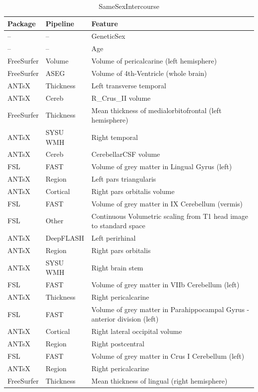 \documentclass[
  10pt,
]{article}
\begin{document}
\begin{table}

\caption{\label{tab:compare-predictions}SameSexIntercourse}
\centering
\begin{tabular}[t]{lll}
\toprule
Package & Pipeline & Feature\\
\midrule
-- & -- & GeneticSex\\
-- & -- & Age\\
FreeSurfer & Volume & Volume of pericalcarine (left hemisphere)\\
FreeSurfer & ASEG & Volume of 4th-Ventricle (whole brain)\\
ANTsX & Thickness & Left transverse temporal\\
\addlinespace
ANTsX & Cereb & R\_Crus\_II volume\\
FreeSurfer & Thickness & Mean thickness of medialorbitofrontal (left hemisphere)\\
ANTsX & SYSU WMH & Right temporal\\
ANTsX & Cereb & CerebellarCSF volume\\
FSL & FAST & Volume of grey matter in Lingual Gyrus (left)\\
\addlinespace
ANTsX & Region & Left pars triangularis\\
ANTsX & Cortical & Right pars orbitalis volume\\
FSL & FAST & Volume of grey matter in IX Cerebellum (vermis)\\
FSL & Other & Continuous    Volumetric scaling from T1 head image to standard space\\
ANTsX & DeepFLASH & Left perirhinal\\
\addlinespace
ANTsX & Region & Right pars orbitalis\\
ANTsX & SYSU WMH & Right brain stem\\
FSL & FAST & Volume of grey matter in VIIb Cerebellum (left)\\
ANTsX & Thickness & Right pericalcarine\\
FSL & FAST & Volume of grey matter in Parahippocampal Gyrus - anterior division (left)\\
\addlinespace
ANTsX & Cortical & Right lateral occipital volume\\
ANTsX & Region & Right postcentral\\
FSL & FAST & Volume of grey matter in Crus I Cerebellum (left)\\
ANTsX & Region & Right pericalcarine\\
FreeSurfer & Thickness & Mean thickness of lingual (right hemisphere)\\
\bottomrule
\end{tabular}
\end{table}
\end{document}
